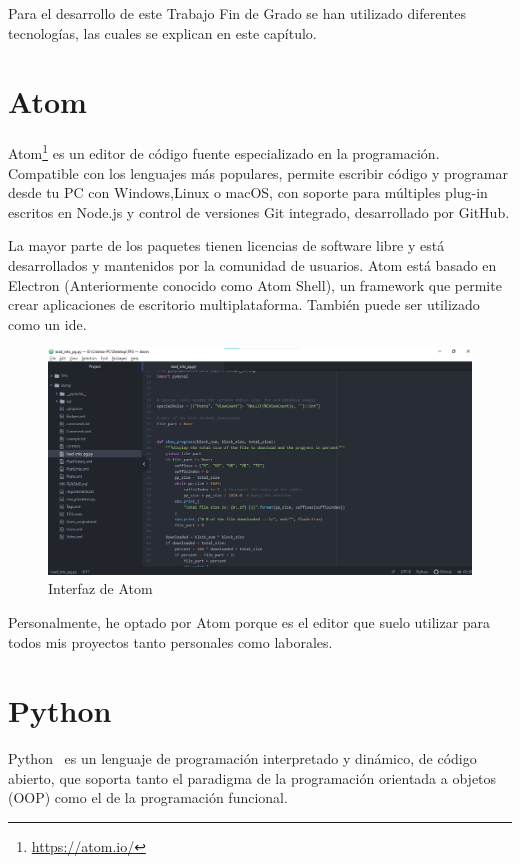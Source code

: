 \documentclass[a4paper, 12pt]{book}
\begin{document}
Para el desarrollo de este Trabajo Fin de Grado se han utilizado diferentes tecnologías, las cuales se explican en este capítulo.

\section{Atom} 
\label{sec:atom}
Atom\footnote{\url{https://atom.io/}} es un editor de código fuente especializado en la programación. Compatible con los lenguajes más populares, permite escribir código y programar desde tu PC con Windows,Linux o macOS, con soporte para múltiples plug-in escritos en Node.js y control de versiones Git integrado, desarrollado por GitHub. 

La mayor parte de los paquetes tienen licencias de software libre y está desarrollados y mantenidos por la comunidad de usuarios. Atom está basado en Electron (Anteriormente conocido como Atom Shell), un framework que permite crear aplicaciones de escritorio multiplataforma. También puede ser utilizado como un \gls{ide}.

\begin{figure}[H]
        \centering
        \includegraphics[width=\textwidth]{img/ATOM.png}
        \caption{Interfaz de Atom}
        \label{figura:ATOM}
    \end{figure}

Personalmente, he optado por Atom porque es el editor que suelo utilizar para todos
mis proyectos tanto personales como laborales. 

\section{Python} 
\label{sec:Python}

Python~\cite{van2007python} es un lenguaje de programación interpretado y dinámico, de código abierto, que
soporta tanto el paradigma de la programación orientada a objetos (OOP) como el de la programación funcional.
\end{document}
